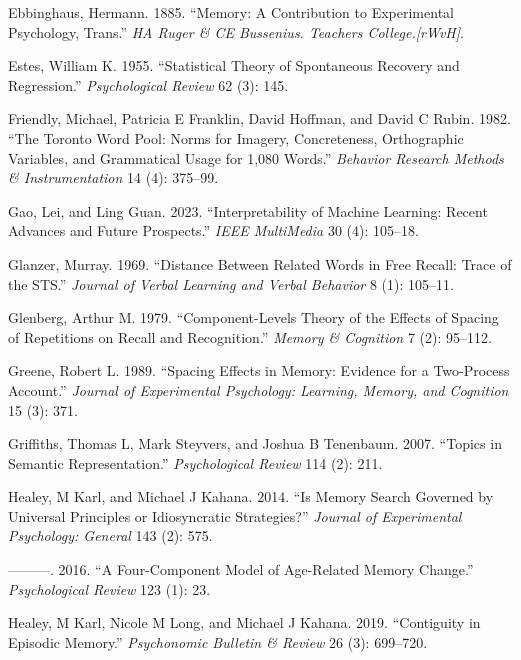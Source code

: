 \documentclass[
  letterpaper,
  11pt,
  english,
  singlespacing,
  headsepline]{MastersDoctoralThesis}
\newlength{\cslhangindent}
\newenvironment{CSLReferences}[2] %
 {\begin{list}{}{%
  \setlength{\itemindent}{0pt}
  \setlength{\leftmargin}{0pt}
  \setlength{\parsep}{0pt}
  \ifodd #1
   \setlength{\leftmargin}{\cslhangindent}
   \setlength{\itemindent}{-1\cslhangindent}
  \fi
  \setlength{\itemsep}{#2\baselineskip}}}
 {\end{list}}
\begin{document}
\begin{CSLReferences}{1}{0}
Ebbinghaus, Hermann. 1885. {``Memory: A Contribution to Experimental
Psychology, Trans.''} \emph{HA Ruger \& CE Bussenius. Teachers
College.{[}rWvH{]}}.

Estes, William K. 1955. {``Statistical Theory of Spontaneous Recovery
and Regression.''} \emph{Psychological Review} 62 (3): 145.

Friendly, Michael, Patricia E Franklin, David Hoffman, and David C
Rubin. 1982. {``The Toronto Word Pool: Norms for Imagery, Concreteness,
Orthographic Variables, and Grammatical Usage for 1,080 Words.''}
\emph{Behavior Research Methods \& Instrumentation} 14 (4): 375--99.

Gao, Lei, and Ling Guan. 2023. {``Interpretability of Machine Learning:
Recent Advances and Future Prospects.''} \emph{IEEE MultiMedia} 30 (4):
105--18.

Glanzer, Murray. 1969. {``Distance Between Related Words in Free Recall:
Trace of the STS.''} \emph{Journal of Verbal Learning and Verbal
Behavior} 8 (1): 105--11.

Glenberg, Arthur M. 1979. {``Component-Levels Theory of the Effects of
Spacing of Repetitions on Recall and Recognition.''} \emph{Memory \&
Cognition} 7 (2): 95--112.

Greene, Robert L. 1989. {``Spacing Effects in Memory: Evidence for a
Two-Process Account.''} \emph{Journal of Experimental Psychology:
Learning, Memory, and Cognition} 15 (3): 371.

Griffiths, Thomas L, Mark Steyvers, and Joshua B Tenenbaum. 2007.
{``Topics in Semantic Representation.''} \emph{Psychological Review} 114
(2): 211.

Healey, M Karl, and Michael J Kahana. 2014. {``Is Memory Search Governed
by Universal Principles or Idiosyncratic Strategies?''} \emph{Journal of
Experimental Psychology: General} 143 (2): 575.

---------. 2016. {``A Four-Component Model of Age-Related Memory
Change.''} \emph{Psychological Review} 123 (1): 23.

Healey, M Karl, Nicole M Long, and Michael J Kahana. 2019. {``Contiguity
in Episodic Memory.''} \emph{Psychonomic Bulletin \& Review} 26 (3):
699--720.


\end{CSLReferences}
\end{document}
